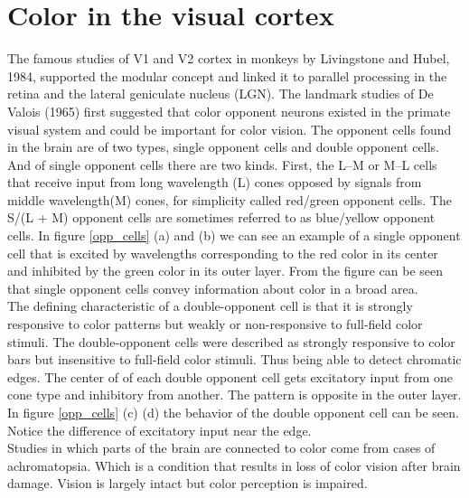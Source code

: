 \documentclass[a4paper,12pt,titlepage, oneside]{article}
\begin{document}
\section{Color in the visual cortex}
The famous studies of V1 and V2 cortex 
in monkeys by Livingstone and Hubel, 1984,
supported the modular concept and linked it 
to parallel processing in the retina and 
the lateral geniculate nucleus (LGN). 
The landmark studies of De Valois (1965) 
first suggested that color opponent neurons 
existed in the primate visual system and 
could be important for color vision. \cite{shapley2011color}
The opponent cells found in the brain 
are of two types, single opponent cells
and double opponent cells.\\
And of single opponent cells there are
two kinds. First, the L–M or M–L cells that 
receive input from long wavelength (L) cones 
opposed by signals from middle wavelength(M) cones, 
for simplicity called red/green opponent cells.
The S/(L + M) opponent cells are sometimes 
referred to as blue/yellow opponent cells. \cite{shapley2011color}
In figure \ref{opp_cells} (a) and (b) we can see
an example of a single opponent cell that is excited 
by wavelengths corresponding to the red 
color in its center and inhibited by the green color 
in its outer layer. From the figure can be seen that single
opponent cells convey information about color in
a broad area. \cite{SPCbook}\\
The defining characteristic of a double-opponent 
cell is that it is strongly responsive to 
color patterns but weakly or non-responsive
to full-field color stimuli. \cite{shapley2011color}
The double-opponent cells were described as strongly 
responsive to color bars but 
insensitive to full-field color stimuli.\cite{shapley2011color}
Thus being able to detect chromatic edges. \cite{SPCbook}
The center of of each double opponent cell gets excitatory 
input from one cone type and inhibitory from another. 
The pattern is opposite in the outer layer.
In figure \ref{opp_cells} (c) (d) the behavior of 
the double opponent cell can be seen. Notice the difference
of excitatory input near the edge.\\
Studies in which parts of the brain are 
connected to color come from cases of achromatopsia.
Which is a condition that results in loss of 
color vision after brain damage. Vision is largely 
intact but color perception is impaired. \cite{SPCbook}
\end{document}
